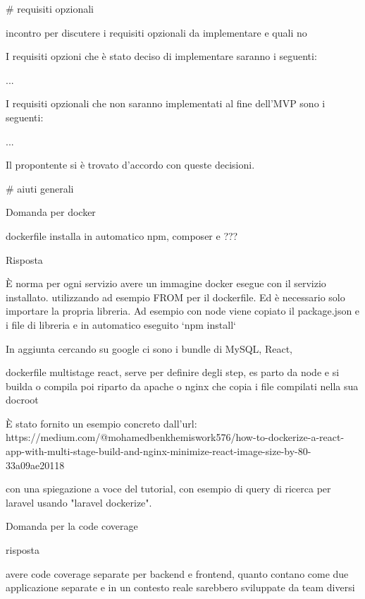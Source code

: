
# requisiti opzionali

incontro per discutere i requisiti opzionali da implementare e quali no

I requisiti opzioni che è stato deciso di implementare saranno i seguenti:

...

I requisiti opzionali che non saranno implementati al fine dell'MVP sono i seguenti:

...

Il propontente si è trovato d'accordo con queste decisioni.


# aiuti generali

Domanda per docker

dockerfile installa in automatico npm, composer e ???


Risposta

È norma per ogni servizio avere un immagine docker esegue con il servizio installato. utilizzando ad esempio FROM per il dockerfile. Ed è necessario solo importare la propria libreria.
Ad esempio con node viene copiato il package.json e i file di libreria e in automatico eseguito `npm install`

In aggiunta cercando su google ci sono i bundle di MySQL, React, 

dockerfile multistage react, serve per definire degli step, 
es parto da node e si builda o compila 
poi riparto da apache o nginx che copia i file compilati nella sua docroot

È stato fornito un esempio concreto dall'url: https://medium.com/@mohamedbenkhemiswork576/how-to-dockerize-a-react-app-with-multi-stage-build-and-nginx-minimize-react-image-size-by-80-33a09ae20118

con una spiegazione a voce del tutorial, con esempio di query di ricerca per laravel usando "laravel dockerize".



Domanda per la code coverage

risposta

avere code coverage separate per backend e frontend, quanto contano come due applicazione separate e in un contesto reale sarebbero sviluppate da team diversi
